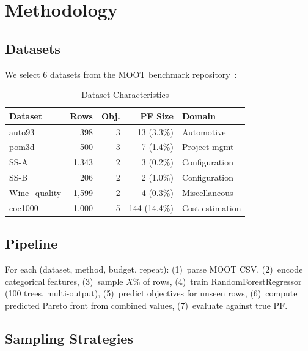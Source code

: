 \documentclass[conference]{IEEEtran}
\begin{document}
\section{Methodology}
\label{sec:method}

\subsection{Datasets}

We select 6 datasets from the MOOT benchmark repository~\cite{moot}:

\begin{table}[htbp]
\caption{Dataset Characteristics}
\label{tab:datasets}
\centering
\begin{tabular}{lrrrl}
\toprule
Dataset & Rows & Obj. & PF Size & Domain \\
\midrule
auto93 & 398 & 3 & 13 (3.3\%) & Automotive \\
pom3d & 500 & 3 & 7 (1.4\%) & Project mgmt \\
SS-A & 1,343 & 2 & 3 (0.2\%) & Configuration \\
SS-B & 206 & 2 & 2 (1.0\%) & Configuration \\
Wine\_quality & 1,599 & 2 & 4 (0.3\%) & Miscellaneous \\
coc1000 & 1,000 & 5 & 144 (14.4\%) & Cost estimation \\
\bottomrule
\end{tabular}
\end{table}

\subsection{Pipeline}

For each (dataset, method, budget, repeat): (1)~parse MOOT CSV, (2)~encode categorical features, (3)~sample $X\%$ of rows, (4)~train RandomForestRegressor (100 trees, multi-output), (5)~predict objectives for unseen rows, (6)~compute predicted Pareto front from combined values, (7)~evaluate against true PF.

\subsection{Sampling Strategies}
\end{document}
